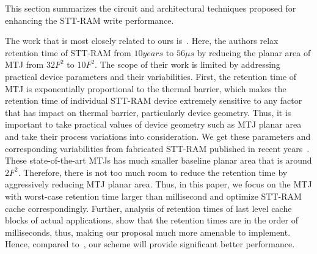 


This section summarizes the circuit and architectural techniques proposed for enhancing the STT-RAM
write performance.

The work that is most closely related to ours is~\cite{STTRAM:HPCA11}.
Here, the authors relax retention time of STT-RAM from $10 years$ to $56 \mu s$ by
reducing the planar area of MTJ from $32F^2$ to $10F^2$. The scope of their work is limited by
addressing practical device parameters and their variabilities. First, the retention time of MTJ is
exponentially proportional to the thermal barrier, which makes the retention time of individual
STT-RAM device extremely sensitive to any factor that has impact on thermal barrier, particularly
device geometry. Thus, it is important to take practical values of device geometry such as MTJ planar
area and take their process variations into consideration. We get these parameters and corresponding
variabilities from fabricated STT-RAM published in recent
years~\cite{PMTJ:Toshiba08,STTRAM:EDL11,STTRAM:Qualcomm09,STTRAM:Grandis11}. These state-of-the-art
MTJs has much smaller baseline planar area that is around $2F^2$. Therefore, there is not too much
room to reduce the retention time by aggressively reducing MTJ planar area. Thus, in this paper, we focus
on the MTJ with worst-case retention time larger than millisecond and optimize STT-RAM cache
correspondingly. Further, analysis of retention times of last level cache blocks of actual
applications, show that the retention times are in the order of milliseconds, thus, making our
proposal much more amenable to implement. Hence, compared to~\cite{STTRAM:HPCA11}, our scheme will
provide significant better performance.

